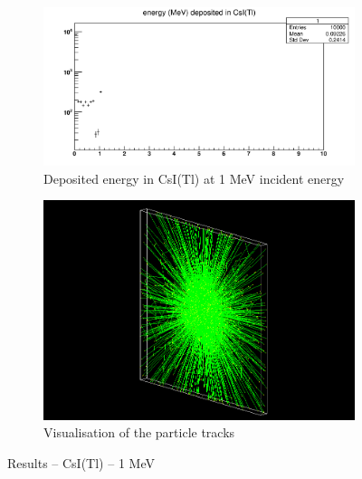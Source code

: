 \documentclass{article}
\begin{document}
\begin{figure}[H]
\centering
\begin{subfigure}{.5\textwidth}
  \centering
  \includegraphics[width=\linewidth]{images/task1/CsI_1MeV.png}
  \caption{Deposited energy in CsI(Tl) at 1 MeV incident energy}
\end{subfigure}%
\begin{subfigure}{.5\textwidth}
  \centering
  \includegraphics[width=\linewidth]{images/task1/CsI_1MeV_10000.png}
  \caption{Visualisation of the particle tracks}
\end{subfigure}
\caption{Results – CsI(Tl) – 1 MeV}
\end{figure}
\end{document}
